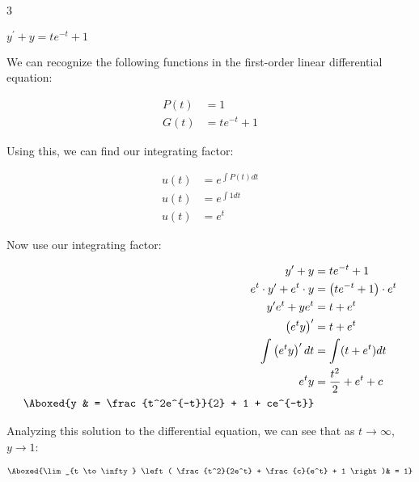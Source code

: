 \documentclass{lapchomework}
\begin{document}
\begin{problems}

\item [3] \begin{subproblems}

\subproblem [c] $y^{\prime}+y=te^{-t}+1$

\begin{solution}

\step We can recognize the following functions in the first-order linear 
differential equation:

\step \begin{align*}
P(t) & =  1 \\
G(t) & = te^{-t} + 1 
\end{align*}

\step Using this, we can find our integrating factor:

\step \begin{align*}
u(t) & = e^{\int P(t) dt} \\
u(t) & = e^{\int 1 dt} \\
u(t) & = e^t
\end{align*}

\step Now use our integrating factor:

\step \begin{align*}
y^{\prime} + y & = te^{-t} + 1 \\
e^t \cdot y^{\prime} + e^t \cdot y & = \left(te^{-t} + 1\right) \cdot e^t \\
y^{\prime}e^t + ye^t & = t + e^t \\
\left(e^ty\right)^{\prime} & = t + e^t \\
\int \left(e^ty\right)^{\prime} dt & = \int (t + e^t) dt \\
e^ty & = \frac{t^2}{2}+e^t+c\\
\Aboxed{y & = \frac{t^2e^{-t}}{2} + 1 + ce^{-t}}
\end{align*}

\item Analyzing this solution to the differential equation, we can see that
as $t \to \infty$, $y \to 1$:

\item \begin{align*}
\Aboxed{\lim_{t \to \infty} \left( \frac{t^2}{2e^t} + \frac{c}{e^t} 
+ 1 \right)& = 1}
\end{align*}

\end{solution}

\end{subproblems}

\end{problems}
\end{document}
